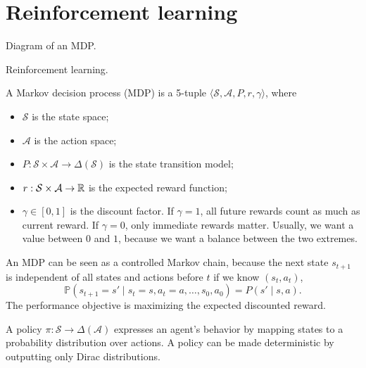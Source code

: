 \section{Reinforcement learning}

\begin{marginfigure}
    \centering
    \caption{Diagram of an MDP.}
    \label{fig:markov-decision-process}
\end{marginfigure}

\begin{marginfigure}
    \centering
    \caption{Reinforcement learning.}
    \label{fig:reinforcement-learning}
\end{marginfigure}

\begin{definition}
    A Markov decision process (MDP) is a 5-tuple $\langle \mathcal{S}, \mathcal{A}, P, r, \gamma \rangle$, where
    \begin{itemize}
        \item $\mathcal{S}$ is the state space;
        \item $\mathcal{A}$ is the action space;
        \item $P: \mathcal{S} \times \mathcal{A} \to \Delta(\mathcal{S})$ is the state transition model;
        \item $r: \mathcal{S} \times \mathcal{A} \to \mathbb{R}$ is the expected reward function;
        \item $\gamma \in [0,1]$ is the discount factor. If $\gamma = 1$, all future rewards count as
              much as current reward. If $\gamma = 0$, only immediate rewards matter. Usually, we want
              a value between $0$ and $1$, because we want a balance between the two extremes.
    \end{itemize}
\end{definition}

An MDP can be seen as a controlled Markov chain, because the next state $s_{t+1}$ is independent of
all states and actions before $t$ if we know $(s_t, a_t)$, \[
    \mathbb{P}(s_{t+1} = s' \mid s_t = s, a_t = a, \ldots, s_0, a_0) = P(s' \mid s, a).
\]
The performance objective is maximizing the expected discounted reward.

\begin{definition}[Policy]
    A policy $\pi: \mathcal{S} \to \Delta(\mathcal{A})$ expresses an agent's behavior by mapping
    states to a probability distribution over actions. A policy can be made deterministic by
    outputting only Dirac distributions.
\end{definition}

